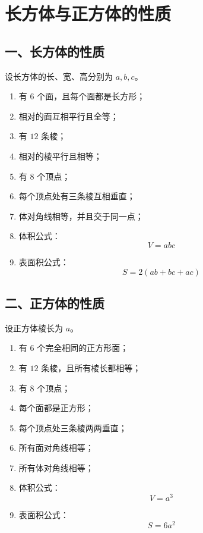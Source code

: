 \documentclass[DIN, pagenumber=false, fontsize=11pt, parskip=half]{scrartcl}
\begin{document}
\section{长方体与正方体的性质}

\subsection*{一、长方体的性质}

设长方体的长、宽、高分别为 $a,b,c$。

\begin{enumerate}
    \item 有 $6$ 个面，且每个面都是长方形；
    \item 相对的面互相平行且全等；
    \item 有 $12$ 条棱；
    \item 相对的棱平行且相等；
    \item 有 $8$ 个顶点；
    \item 每个顶点处有三条棱互相垂直；
    \item 体对角线相等，并且交于同一点；
    \item 体积公式：
    \[
    V=abc
    \]
    \item 表面积公式：
    \[
    S=2(ab+bc+ac)
    \]
\end{enumerate}

\bigskip

\subsection*{二、正方体的性质}

设正方体棱长为 $a$。

\begin{enumerate}
    \item 有 $6$ 个完全相同的正方形面；
    \item 有 $12$ 条棱，且所有棱长都相等；
    \item 有 $8$ 个顶点；
    \item 每个面都是正方形；
    \item 每个顶点处三条棱两两垂直；
    \item 所有面对角线相等；
    \item 所有体对角线相等；
    \item 体积公式：
    \[
    V=a^3
    \]
    \item 表面积公式：
    \[
    S=6a^2
    \]
\end{enumerate}
\end{document}
